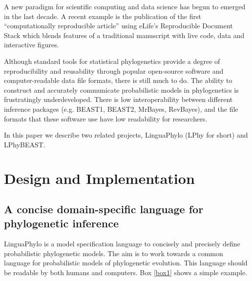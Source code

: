\documentclass[10pt,letterpaper,table]{article}
\begin{document}
A new paradigm for scientific computing and data science has begun to
emerged in the last decade.
A recent example is the publication of the
first ``computationally reproducible article'' using eLife's
Reproducible Document Stack which blends features of a traditional
manuscript with live code, data and interactive figures.

Although standard tools for statistical phylogenetics provide a degree
of reproducibility and reusability through popular open-source
software and computer-readable data file formats, there is still much
to do.
The ability to construct and accurately communicate
probabilistic models in phylogenetics is frustratingly
underdeveloped.
There is low interoperability between different
inference packages (e.g. BEAST1, BEAST2, MrBayes, RevBayes), and the
file formats that these software use have low readability for
researchers.

In this paper we describe two related projects, LinguaPhylo (LPhy for
short) and LPhyBEAST.

\section*{Design and Implementation}

\subsection*{A concise domain-specific language for phylogenetic inference}

LinguaPhylo is a model specification language to concisely and
precisely define probabilistic phylogenetic models.
The aim is to work
towards a common language for probabilistic models of phylogenetic
evolution.
This language should be readable by both humans and
computers.
Box \ref{box1} shows a simple example.
\end{document}
